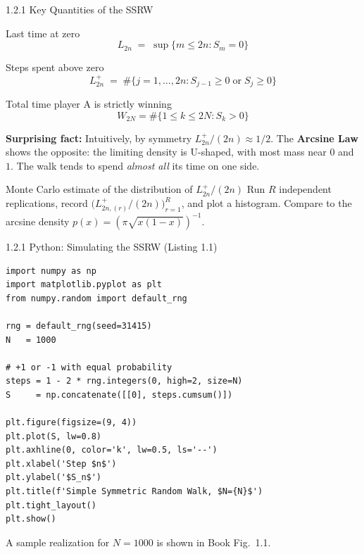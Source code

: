 \documentclass[aspectratio=169,10pt]{beamer}
\begin{document}
\begin{frame}[allowframebreaks]{1.2.1 Key Quantities of the SSRW}

  \begin{block}{Last time at zero}
    \[
      L_{2n} \;=\; \sup\{m \le 2n : S_m = 0\}
    \]
  \end{block}

  \begin{block}{Steps spent above zero}
    \[
      L^+_{2n} \;=\; \#\{j = 1, \ldots, 2n :
        S_{j-1} \ge 0 \;\text{or}\; S_j \ge 0\}
    \]
  \end{block}

  \begin{block}{Total time player A is strictly winning}
    \[
      W_{2N} = \#\{1 \le k \le 2N : S_k > 0\}
    \]
  \end{block}

  \framebreak

  \textbf{Surprising fact:}
  Intuitively, by symmetry $L^+_{2n}/(2n) \approx 1/2$.
  The \textbf{Arcsine Law} shows the opposite: the limiting density
  is U-shaped, with most mass near $0$ and $1$. The walk tends to
  spend \emph{almost all} its time on one side.

  \begin{exampleblock}{Monte Carlo estimate of the distribution of $L^+_{2n}/(2n)$}
    Run $R$ independent replications, record
    $\bigl(L^+_{2n,(r)}/(2n)\bigr)_{r=1}^R$, and plot a histogram.
    Compare to the arcsine density $p(x) = (\pi\sqrt{x(1-x)})^{-1}$.
  \end{exampleblock}

\end{frame}

\begin{frame}[fragile]{1.2.1 Python: Simulating the SSRW (Listing 1.1)}

\begin{lstlisting}[style=python, caption={Simple symmetric random walk simulation}]
import numpy as np
import matplotlib.pyplot as plt
from numpy.random import default_rng

rng = default_rng(seed=31415)
N   = 1000

# +1 or -1 with equal probability
steps = 1 - 2 * rng.integers(0, high=2, size=N)
S     = np.concatenate([[0], steps.cumsum()])

plt.figure(figsize=(9, 4))
plt.plot(S, lw=0.8)
plt.axhline(0, color='k', lw=0.5, ls='--')
plt.xlabel('Step $n$')
plt.ylabel('$S_n$')
plt.title(f'Simple Symmetric Random Walk, $N={N}$')
plt.tight_layout()
plt.show()
\end{lstlisting}

  A sample realization for $N = 1000$ is shown in Book Fig.~1.1.

\end{frame}
\end{document}
